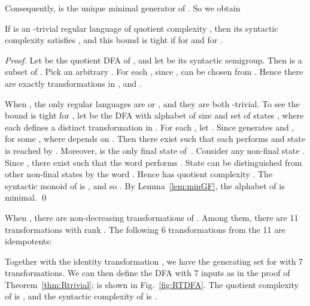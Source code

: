 \documentclass{llncs}
\newcommand{\qedb}{\hfill}
\begin{document}
Consequently,  is the unique minimal generator of . So we obtain  

\begin{theorem}\label{thm:Rtrivial}
If  is an -trivial regular language of quotient complexity , then its syntactic complexity  satisfies , and this bound is tight if  for  and  for .  
\end{theorem}


\begin{proof}
Let  be the quotient DFA of , and let  be its syntactic semigroup. Then  is a subset of . Pick an arbitrary . For each , since ,  can be chosen from . Hence there are exactly  transformations in , and . 

When , the only regular languages are  or , and they are both  -trivial. To see the bound is tight for , let  be the DFA with alphabet  of size  and set of states , where each  defines a distinct transformation in . For each , let . Since  generates  and ,  for some , where  depends on . Then there exist  such that each  performs  and state  is reached by . Moreover,  is the only final state of~. Consider any non-final state . Since , there exist  such that the word  performs . State  can be distinguished from other non-final states by the word . Hence  has quotient complexity . The syntactic monoid of  is , and so . By Lemma~\ref{lem:minGF}, the alphabet of  is minimal. \qed
\end{proof}


\begin{example}\label{ex:Rtrivial}
When , there are  non-decreasing transformations of . Among them, there are 11 transformations with rank . The following 6 transformations from the 11 are idempotents: 

Together with the identity transformation , we have the generating set  for  with 7 transformations. We can then define the DFA  with 7 inputs as in the proof of Theorem~\ref{thm:Rtrivial};  is shown in Fig.~\ref{fig:RTDFA}. The quotient complexity of  is , and the syntactic complexity of  is . \qedb
\end{example}
\end{document}
